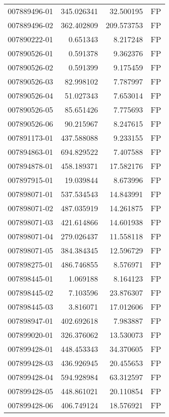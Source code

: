 \begin{tabular}{lrrl}
007889496-01 &  345.026341 &    32.500195 &   FP \\
007889496-02 &  362.402809 &   209.573753 &   FP \\
007890222-01 &    0.651343 &     8.217248 &   FP \\
007890526-01 &    0.591378 &     9.362376 &   FP \\
007890526-02 &    0.591399 &     9.175459 &   FP \\
007890526-03 &   82.998102 &     7.787997 &   FP \\
007890526-04 &   51.027343 &     7.653014 &   FP \\
007890526-05 &   85.651426 &     7.775693 &   FP \\
007890526-06 &   90.215967 &     8.247615 &   FP \\
007891173-01 &  437.588088 &     9.233155 &   FP \\
007894863-01 &  694.829522 &     7.407588 &   FP \\
007894878-01 &  458.189371 &    17.582176 &   FP \\
007897915-01 &   19.039844 &     8.673996 &   FP \\
007898071-01 &  537.534543 &    14.843991 &   FP \\
007898071-02 &  487.035919 &    14.261875 &   FP \\
007898071-03 &  421.614866 &    14.601938 &   FP \\
007898071-04 &  279.026437 &    11.558118 &   FP \\
007898071-05 &  384.384345 &    12.596729 &   FP \\
007898275-01 &  486.746855 &     8.576971 &   FP \\
007898445-01 &    1.069188 &     8.164123 &   FP \\
007898445-02 &    7.103596 &    23.876307 &   FP \\
007898445-03 &    3.816071 &    17.012606 &   FP \\
007898947-01 &  402.692618 &     7.983887 &   FP \\
007899020-01 &  326.376062 &    13.530073 &   FP \\
007899428-01 &  448.453343 &    34.370605 &   FP \\
007899428-03 &  436.926945 &    20.455653 &   FP \\
007899428-04 &  594.928984 &    63.312597 &   FP \\
007899428-05 &  448.861021 &    20.110854 &   FP \\
007899428-06 &  406.749124 &    18.576921 &   FP \\

\end{tabular}
